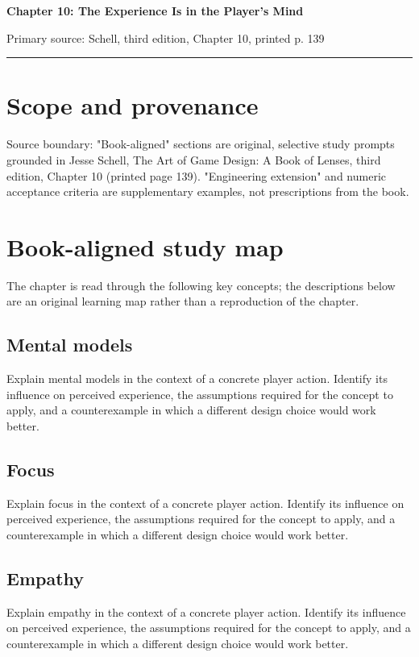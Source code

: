 \documentclass[11pt]{article}
\begin{document}
{\huge\bfseries\color{suiteblue} Chapter 10: The Experience Is in the Player's Mind}\par
\vspace{0.15in}
{\normalsize\color{suitegray} Primary source: Schell, third edition, Chapter 10, printed p. 139}\par
\vspace{0.15in}\hrule\vspace{0.15in}

\section{Scope and provenance}
Source boundary: "Book-aligned" sections are original, selective study prompts grounded in Jesse Schell, The Art of Game Design: A Book of Lenses, third edition, Chapter 10 (printed page 139). "Engineering extension" and numeric acceptance criteria are supplementary examples, not prescriptions from the book.


\section{Book-aligned study map}
The chapter is read through the following key concepts; the descriptions below are an original learning map rather than a reproduction of the chapter.


\subsection{Mental models}
Explain mental models in the context of a concrete player action. Identify its influence on perceived experience, the assumptions required for the concept to apply, and a counterexample in which a different design choice would work better.


\subsection{Focus}
Explain focus in the context of a concrete player action. Identify its influence on perceived experience, the assumptions required for the concept to apply, and a counterexample in which a different design choice would work better.


\subsection{Empathy}
Explain empathy in the context of a concrete player action. Identify its influence on perceived experience, the assumptions required for the concept to apply, and a counterexample in which a different design choice would work better.
\end{document}
